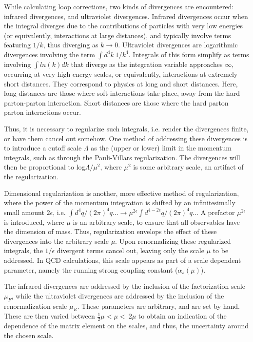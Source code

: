 \documentclass[11pt,a4paper,openright,twoside]{report}
\begin{document}
While calculating loop corrections, two kinds of divergences are encountered: infrared divergences, and ultraviolet divergences. Infrared divergences occur when the integral diverges due to the contributions of particles with very low energies (or equivalently, interactions at large distances), and typically involve terms featuring $1/k$, thus diverging as $k\to 0$. Ultraviolet divergences are logarithmic divergences involving the term $\int d^4k\ 1/k^4$. Integrals of this form simplify as terms involving $\int ln(k) dk$ that diverge as the integration variable approaches $\infty$, occurring at very high energy scales, or equivalently, interactions at extremely short distances. They correspond to physics at long and short distances. Here, long distances are those where soft interactions take place, away from the hard parton-parton interaction. Short distances are those where the hard parton parton interactions occur.

Thus, it is necessary to regularize such integrals, i.e. render the divergences finite, or have them cancel out somehow. One method of addressing these divergences is to introduce a cutoff scale $\Lambda$ as the (upper or lower) limit in the momentum integrals, such as through the Pauli-Villars regularization. The divergences will then be proportional to log$\Lambda/\mu^2$, where $\mu^2$ is some arbitrary scale, an artifact of the regularization.

Dimensional regularization is another, more effective method of regularization, where the power of the momentum integration is shifted by an infinitesimally small amount $2\epsilon$, i.e. $\int d^4q/(2\pi)^4 q... \to \mu^{2\epsilon}\int d^{4-2\epsilon}q/(2\pi)^4 q...$ A prefactor $\mu^{2\epsilon}$ is introduced, where $\mu$ is an arbitrary scale, to ensure that all observables have the dimension of mass. Thus, regularization envelops the effect of these divergences into the arbitrary scale $\mu$. Upon renormalizing these regularized integrals, the $1/\epsilon$ divergent terms cancel out, leaving only the scale $\mu$ to be addressed. In QCD calculations, this scale appears as part of a scale dependent parameter, namely the running strong coupling constant ($\alpha_s(\mu)$).

The infrared divergences are addressed by the inclusion of the factorization scale $\mu_F$, while the ultraviolet divergences are addressed by the inclusion of the renormalization scale $\mu_R$. These parameters are arbitrary, and are set by hand. These are then varied between $\frac{1}{2}\mu < \mu < \ 2\mu$ to obtain an indication of the dependence of the matrix element on the scales, and thus, the uncertainty around the chosen scale. 
\end{document}
